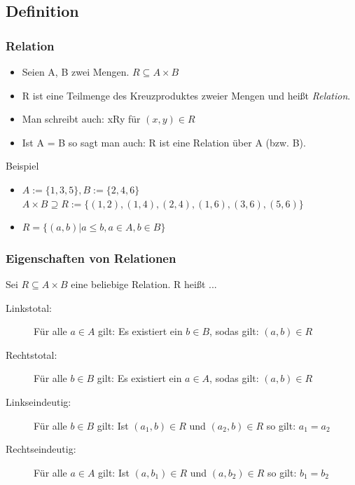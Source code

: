 \documentclass{beamer}
\begin{document}
\subsection{Definition}
\begin{frame}
  \frametitle{Relation}
  \begin{definition}
    \begin{itemize}
      \item Seien A, B zwei Mengen. $ R \subseteq A \times B $
      \item R ist eine Teilmenge des Kreuzproduktes zweier Mengen und heißt \emph{Relation}.
      \item Man schreibt auch: xRy für $(x, y) \in R$
      \item Ist A = B so sagt man auch: R ist eine Relation über A (bzw. B).
    \end{itemize}
  \end{definition} \pause
  \begin{exampleblock}{Beispiel}
    \begin{itemize}
    \item $ A := \{1, 3, 5\}, B := \{2, 4, 6\}$ $A \times B \supseteq R := \{(1, 2), (1, 4), (2, 4), (1, 6), (3, 6), (5, 6)\}$ \pause
    \item $ R = \{(a, b) | a \leq b, a \in A, b \in B \}$
    \end{itemize}
  \end{exampleblock}
\end{frame}
\begin{frame}
  \frametitle{Eigenschaften von Relationen}
  \begin{definition}
      Sei $R \subseteq A \times B$ eine beliebige Relation. R heißt ...
      \begin{description}
        \item[Linkstotal:] Für alle $a \in A$ gilt: Es existiert ein $b \in B$, sodas gilt: $(a, b) \in R$
        \item[Rechtstotal:] Für alle $b \in B$ gilt: Es existiert ein $a \in A$, sodas gilt: $(a, b) \in R$
        \item[Linkseindeutig:] Für alle $b \in B$ gilt: Ist $(a_1, b) \in R$ und $(a_2, b) \in R$ so gilt: $a_1 = a_2$
        \item[Rechtseindeutig:] Für alle $a \in A$ gilt: Ist $(a, b_1) \in R$ und $(a, b_2) \in R$ so gilt: $b_1 = b_2$
      \end{description}
  \end{definition}
\end{frame}
\end{document}
